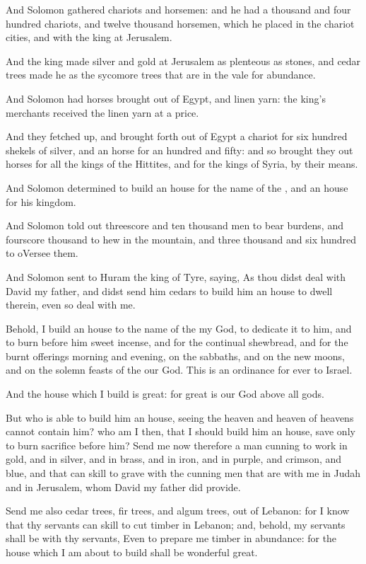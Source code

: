 \Verse And Solomon gathered chariots and horsemen: and he had a thousand and four hundred chariots, and twelve thousand horsemen, which he placed in the chariot cities, and with the king at Jerusalem.

\Verse And the king made silver and gold at Jerusalem as plenteous as stones, and cedar trees made he as the sycomore trees that are in the vale for abundance.

\Verse And Solomon had horses brought out of Egypt, and linen yarn: the king's merchants received the linen yarn at a price.

\Verse And they fetched up, and brought forth out of Egypt a chariot for six hundred shekels of silver, and an horse for an hundred and fifty: and so brought they out horses for all the kings of the Hittites, and for the kings of Syria, by their means.


\Chapter
\Verse And Solomon determined to build an house for the name of the \LORD, and an house for his kingdom.

\Verse And Solomon told out threescore and ten thousand men to bear burdens, and fourscore thousand to hew in the mountain, and three thousand and six hundred to oVersee them.

\Verse And Solomon sent to Huram the king of Tyre, saying, As thou didst deal with David my father, and didst send him cedars to build him an house to dwell therein, even so deal with me.

\Verse Behold, I build an house to the name of the \LORD my God, to dedicate it to him, and to burn before him sweet incense, and for the continual shewbread, and for the burnt offerings morning and evening, on the sabbaths, and on the new moons, and on the solemn feasts of the \LORD our God. This is an ordinance for ever to Israel.

\Verse And the house which I build is great: for great is our God above all gods.

\Verse But who is able to build him an house, seeing the heaven and heaven of heavens cannot contain him? who am I then, that I should build him an house, save only to burn sacrifice before him?  \Verse Send me now therefore a man cunning to work in gold, and in silver, and in brass, and in iron, and in purple, and crimson, and blue, and that can skill to grave with the cunning men that are with me in Judah and in Jerusalem, whom David my father did provide.

\Verse Send me also cedar trees, fir trees, and algum trees, out of Lebanon: for I know that thy servants can skill to cut timber in Lebanon; and, behold, my servants shall be with thy servants, \Verse Even to prepare me timber in abundance: for the house which I am about to build shall be wonderful great.

